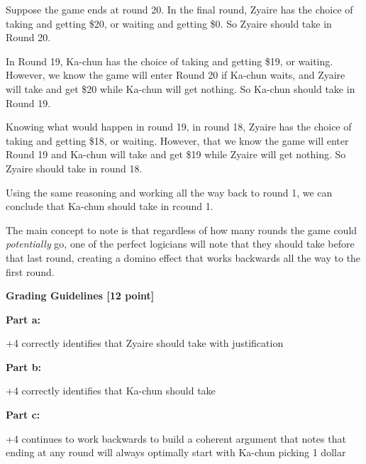 \documentclass[12pt]{exam}
\begin{document}
\begin{solution}
\begin{qparts}
    \item Suppose the game ends at round 20. In the final round, Zyaire has the choice of taking and getting \$20, or waiting and getting \$0. So Zyaire should take in Round 20.
    
    \item In Round 19, Ka-chun has the choice of taking and getting \$19, or waiting. However, we know the game will enter Round 20 if Ka-chun waits, and Zyaire will take and get \$20 while Ka-chun will get nothing. So Ka-chun should take in Round 19.
    
    \item Knowing what would happen in round 19, in round 18, Zyaire has the choice of taking and getting \$18, or waiting. However, that we know the game will enter Round 19 and Ka-chun will take and get \$19 while Zyaire will get nothing. So Zyaire should take in round 18.
    
    Using the same reasoning and working all the way back to round 1, we can conclude that Ka-chun should take in rcound 1.
    
    The main concept to note is that regardless of how many rounds the game could \textit{potentially} go, one of the perfect logicians will note that they should take before that last round, creating a domino effect that works backwards all the way to the first round.
\end{qparts}

\textbf{Grading Guidelines [12 point]}

\textbf{Part a:}
\begin{guidelines}
    \item +4 correctly identifies that Zyaire should take with justification
\end{guidelines}
\textbf{Part b:}
\begin{guidelines}
    \item +4 correctly identifies that Ka-chun should take
\end{guidelines}
\textbf{Part c:}
\begin{guidelines}
    \item +4 continues to work backwards to build a coherent argument that notes that ending at any round will always optimally start with Ka-chun picking 1 dollar
\end{guidelines}
\end{solution}
\end{document}
